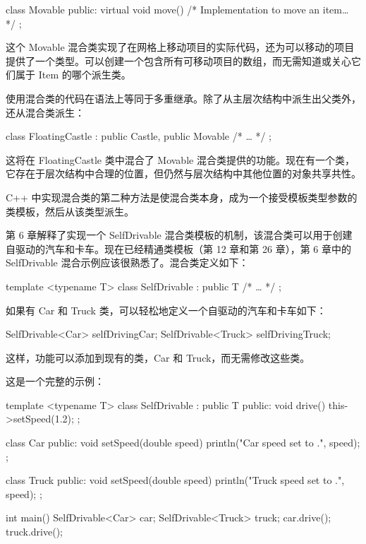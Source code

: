 \begin{cpp}
class Movable
{
    public:
        virtual void move() { /* Implementation to move an item… */ }
};
\end{cpp}

这个 Movable 混合类实现了在网格上移动项目的实际代码，还为可以移动的项目提供了一个类型。可以创建一个包含所有可移动项目的数组，而无需知道或关心它们属于 Item 的哪个派生类。


使用混合类的代码在语法上等同于多重继承。除了从主层次结构中派生出父类外，还从混合类派生：

\begin{cpp}
class FloatingCastle : public Castle, public Movable { /* … */ };
\end{cpp}

这将在 FloatingCastle 类中混合了 Movable 混合类提供的功能。现在有一个类，它存在于层次结构中合理的位置，但仍然与层次结构中其他位置的对象共享共性。


C++ 中实现混合类的第二种方法是使混合类本身，成为一个接受模板类型参数的类模板，然后从该类型派生。

第 6 章解释了实现一个 SelfDrivable 混合类模板的机制，该混合类可以用于创建自驱动的汽车和卡车。现在已经精通类模板（第 12 章和第 26 章），第 6 章中的 SelfDrivable 混合示例应该很熟悉了。混合类定义如下：

\begin{cpp}
template <typename T>
class SelfDrivable : public T { /* … */ };
\end{cpp}

如果有 Car 和 Truck 类，可以轻松地定义一个自驱动的汽车和卡车如下：

\begin{cpp}
SelfDrivable<Car> selfDrivingCar;
SelfDrivable<Truck> selfDrivingTruck;
\end{cpp}

这样，功能可以添加到现有的类，Car 和 Truck，而无需修改这些类。

这是一个完整的示例：

\begin{cpp}
template <typename T>
class SelfDrivable : public T
{
    public:
        void drive() { this->setSpeed(1.2); }
};

class Car
{
    public:
        void setSpeed(double speed) { println("Car speed set to {}.", speed); }
};

class Truck
{
    public:
        void setSpeed(double speed) { println("Truck speed set to {}.", speed); }
};

int main()
{
    SelfDrivable<Car> car;
    SelfDrivable<Truck> truck;
    car.drive();
    truck.drive();
}
\end{cpp}


